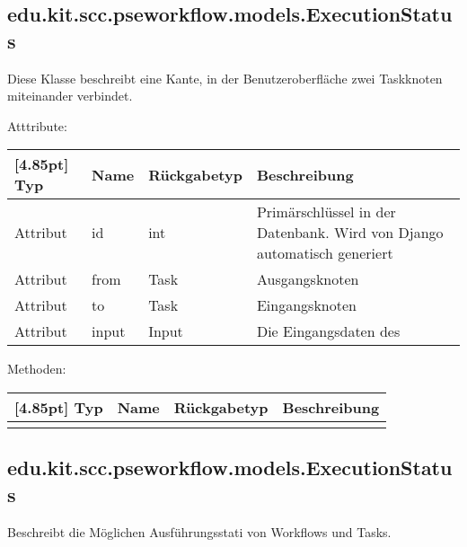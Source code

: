        \subsection{edu.kit.scc.pseworkflow.models.ExecutionStatus}	
    			Diese Klasse beschreibt eine Kante, in der Benutzeroberfläche zwei Taskknoten miteinander verbindet. 
    			
    			Atttribute:
    			\begin{center}
    				\setlength\tabcolsep{5pt}
    				\renewcommand{\arraystretch}{1.5}
    				
    				\begin{tabularx}{\textwidth}{|l|l|l|X|}
    					\hline
    					\rowcolor[gray]{0.75}[4.85pt]
    					Typ & Name & Rückgabetyp & Beschreibung \\ \hline 
    	           		Attribut & id & int & Primärschlüssel in der Datenbank. Wird von Django automatisch generiert \\ \hline
    	           		Attribut & from & Task & Ausgangsknoten \\ \hline
    	           		Attribut & to & Task & Eingangsknoten \\ \hline
    	           		Attribut & input & Input & Die Eingangsdaten des 
    	           		
    	           		\hline
    				\end{tabularx}
    			\end{center}
    			
    			Methoden:
    			\begin{center}
    				\setlength\tabcolsep{5pt}
    				\renewcommand{\arraystretch}{1.5}
    				
    				\begin{tabularx}{\textwidth}{|l|l|l|X|}
    					\hline
    					\rowcolor[gray]{0.75}[4.85pt]
    					Typ & Name & Rückgabetyp & Beschreibung \\ \hline
    					&&& \\ 
    					\hline
    				\end{tabularx}
    			\end{center}
    			
    			
    
    
		\subsection{edu.kit.scc.pseworkflow.models.ExecutionStatus}	
			Beschreibt die Möglichen Ausführungsstati von Workflows und Tasks.
			
